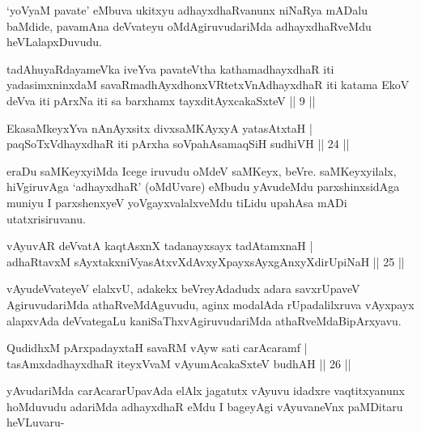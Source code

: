 \begin{artha}%
`yoV\s yaM pavate' eMbuva ukitxyu adhayxdhaRvanunx niNaRya mADalu baMdide, pavamAna deVvateyu oMdAgiruvudariMda adhayxdhaRveMdu heVLalapxDuvudu.
\end{artha}


\begin{kandikeshl}
tadAhuyaRdayameVka iveYva pavateV\s tha kathamadhayxdhaR iti yadasimxninxdaM savaRmadhAyxdhonxVRtetxVnAdhayxdhaR iti katama EkoV deVva iti pArxNa iti sa barxhamx tayxditAyxcakaSxteV || 9 ||
\end{kandikeshl}


\begin{shl}
EkasaMkeyxYva nAnAyx\s sitx divxsaMKAyxyA yatasAtxtaH |\\
paqSoTxV\s dhayxdhaR iti pArxha soVpahAsamaqSiH sudhiVH \hfill || 24 ||
\end{shl}

\begin{artha}
eraDu saMKeyxyiMda Icege iruvudu oMdeV saMKeyx, beVre. saMKeyxyilalx, hiVgiruvAga `adhayxdhaR' (oMdUvare) eMbudu yAvudeMdu parxshinxsidAga muniyu I parxshenxyeV yoVgayxvalalxveMdu tiLidu upahAsa mADi utatxrisiruvanu.
\end{artha}

\begin{shl}
vAyuvAR deVvatA kaqtAsxnX tadanayxsayx tadAtamxnaH |\\
adhaRtavxM sAyxtakxniVyasAtxvXdAvxyXpayxsAyxgAnxyXdirUpiNaH \hfill || 25 ||
\end{shl}

\begin{artha}
vAyudeVvateyeV elalxvU, adakekx beVreyAdadudx adara savxrUpaveV AgiruvudariMda athaRveMdAguvudu, aginx modalAda rUpadalilxruva vAyxpayx alapxvAda deVvategaLu kaniSaThxvAgiruvudariMda athaRveMdaBipArxyavu.
\end{artha}


\begin{shl}
QudidhxM pArxpadayxtaH savaRM vAyw sati carAcaramf |\\
tasAmxdadhayxdhaR iteyxVvaM vAyumAcakaSxteV budhAH \hfill || 26 ||
\end{shl}

\begin{artha}
yAvudariMda carAcararUpavAda elAlx jagatutx vAyuvu idadxre vaqtitxyanunx hoMduvudu adariMda adhayxdhaR eMdu I bageyAgi vAyuvaneVnx paMDitaru heVLuvaru-
\end{artha}


